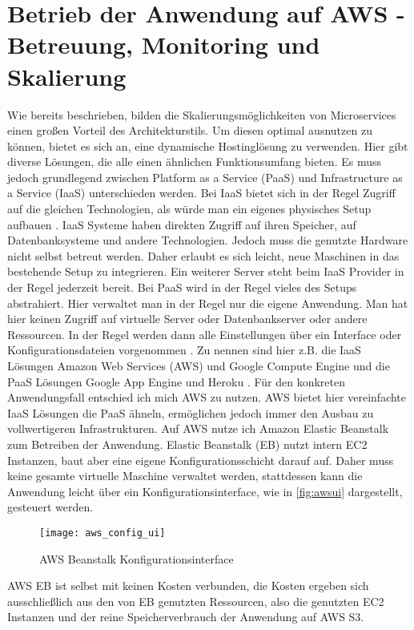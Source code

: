 \section{Betrieb der Anwendung auf AWS - Betreuung, Monitoring und Skalierung}
Wie bereits beschrieben, bilden die Skalierungsmöglichkeiten von Microservices einen großen Vorteil des Architekturstils. Um diesen optimal ausnutzen zu können, bietet es sich an, eine dynamische Hostinglösung zu verwenden. Hier gibt diverse Lösungen, die alle einen ähnlichen Funktionsumfang bieten. Es muss jedoch grundlegend zwischen Platform as a Service (PaaS) und Infrastructure as a Service (IaaS) unterschieden werden. 
Bei IaaS bietet sich in der Regel Zugriff auf die gleichen Technologien, als würde man ein eigenes physisches Setup aufbauen \cite{iaaspaas}. IaaS Systeme haben direkten Zugriff auf ihren Speicher, auf Datenbanksysteme und andere Technologien. Jedoch muss die genutzte Hardware nicht selbst betreut werden. Daher erlaubt es sich leicht, neue Maschinen in das bestehende Setup zu integrieren. Ein weiterer Server steht beim IaaS Provider in der Regel jederzeit bereit.
Bei PaaS wird in der Regel vieles des Setups abstrahiert. Hier verwaltet man in der Regel nur die eigene Anwendung. Man hat hier keinen Zugriff auf virtuelle Server oder Datenbankserver oder andere Ressourcen. In der Regel werden dann alle Einstellungen über ein Interface oder Konfigurationsdateien vorgenommen \cite{heroku:config}.
Zu nennen sind hier z.B. die IaaS Lösungen Amazon Web Services (AWS) und Google Compute Engine \cite{googlecompute} und die PaaS Lösungen Google App Engine \cite{googleapp} und Heroku \cite{heroku}.
Für den konkreten Anwendungsfall entschied ich mich AWS zu nutzen. AWS bietet hier vereinfachte IaaS Lösungen die PaaS ähneln, ermöglichen jedoch immer den Ausbau zu vollwertigeren Infrastrukturen.
Auf AWS nutze ich Amazon Elastic Beanstalk \cite{aws:beanstalk} zum Betreiben der Anwendung. Elastic Beanstalk (EB) nutzt intern EC2 Instanzen, baut aber eine eigene Konfigurationsschicht darauf auf. Daher muss keine gesamte virtuelle Maschine verwaltet werden, stattdessen kann die Anwendung leicht über ein Konfigurationsinterface, wie in \autoref{fig:awsui} dargestellt, gesteuert werden.

\begin{figure}[!ht]
    \centering
    \caption{AWS Beanstalk Konfigurationsinterface}
    \label{fig:awsui}
    \texttt{[image: aws\_config\_ui]}
\end{figure}
AWS EB ist selbst mit keinen Kosten verbunden, die Kosten ergeben sich ausschließlich aus den von EB genutzten Ressourcen, also die genutzten EC2 Instanzen und der reine Speicherverbrauch der Anwendung auf AWS S3. 

